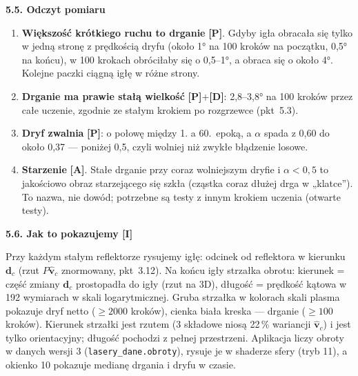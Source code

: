 \documentclass[a4paper,11pt]{article}
\newcommand{\stD}{\textcolor{dok}{\textsf{\textbf{[D]}}}}
\newcommand{\stP}{\textcolor{pom}{\textsf{\textbf{[P]}}}}
\newcommand{\stI}{\textcolor{ilu}{\textsf{\textbf{[I]}}}}
\newcommand{\stA}{\textcolor{ana}{\textsf{\textbf{[A]}}}}
\newcommand{\elem}[1]{\par\medskip\noindent\textbf{#1}\par\nopagebreak}
\begin{document}
\elem{5.5. Odczyt pomiaru}
\begin{enumerate}
\item \textbf{Większość krótkiego ruchu to drganie} \stP. Gdyby igła obracała się tylko w jedną stronę z prędkością dryfu (około 1° na
100 kroków na początku, 0,5° na końcu), w 100 krokach obróciłaby się o 0,5--1°, a obraca się o około 4°. Kolejne paczki ciągną igłę w różne strony.
\item \textbf{Drganie ma prawie stałą wielkość} \stP+\stD: 2,8--3,8° na 100 kroków przez całe uczenie, zgodnie ze stałym krokiem
po rozgrzewce (pkt~5.3).
\item \textbf{Dryf zwalnia} \stP: o połowę między 1. a 60.~epoką, a $\alpha$ spada z 0,60 do około 0,37 --- poniżej 0,5, czyli wolniej niż
zwykłe błądzenie losowe.
\item \textbf{Starzenie} \stA. Stałe drganie przy coraz wolniejszym dryfie i $\alpha<0{,}5$ to jakościowo obraz starzejącego się szkła
(cząstka coraz dłużej drga w „klatce”). To nazwa, nie dowód; potrzebne są testy z innym krokiem uczenia (otwarte testy).
\end{enumerate}

\elem{5.6. Jak to pokazujemy \stI}
Przy każdym stałym reflektorze rysujemy igłę: odcinek od reflektora w kierunku $\bm d_c$ (rzut $P\hat{\bm v}_c$ znormowany, pkt~3.12).
Na końcu igły strzałka obrotu: kierunek = część zmiany $\bm d_c$ prostopadła do igły (rzut na 3D), długość = prędkość kątowa w 192
wymiarach w skali logarytmicznej. Gruba strzałka w kolorach skali plasma pokazuje dryf netto ($\ge2000$ kroków), cienka biała kreska ---
drganie ($\ge100$ kroków). Kierunek strzałki jest rzutem (3 składowe niosą 22\,\% wariancji $\hat{\bm v}_c$) i jest tylko orientacyjny;
długość pochodzi z pełnej przestrzeni. Aplikacja liczy obroty w danych wersji 3 (\texttt{lasery\_dane.obroty}), rysuje je
w shaderze sfery (tryb 11), a okienko 10 pokazuje medianę drgania i dryfu w czasie.

\end{document}
